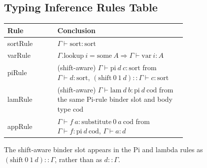 \subsection{Typing Inference Rules Table}\label{subsec:reconstruction-typing-rules-table}

\begin{center}
\begin{tabular}{l p{0.72\linewidth}}
\hline
Rule & Conclusion \\
\hline
sortRule & $\Gamma \vdash \mathrm{sort} : \mathrm{sort}$ \\
varRule & $\Gamma.\mathrm{lookup}\ i = \mathrm{some}\ A \Rightarrow \Gamma \vdash \mathrm{var}\ i : A$ \\
piRule & (shift-aware) $\Gamma \vdash \mathrm{pi}\ d\ c : \mathrm{sort}$ from $\Gamma \vdash d : \mathrm{sort}$, $(\mathrm{shift}\ 0\ 1\ d) :: \Gamma \vdash c : \mathrm{sort}$ \\
lamRule & (shift-aware) $\Gamma \vdash \mathrm{lam}\ d\ b : \mathrm{pi}\ d\ \mathrm{cod}$ from the same Pi-rule binder slot and body type $\mathrm{cod}$ \\
appRule & $\Gamma \vdash f\ a : \mathrm{substitute}\ 0\ a\ \mathrm{cod}$ from $\Gamma \vdash f : \mathrm{pi}\ d\ \mathrm{cod}$, $\Gamma \vdash a : d$ \\
\hline
\end{tabular}
\end{center}

The shift-aware binder slot appears in the Pi and lambda rules as
$(\mathrm{shift}\ 0\ 1\ d) :: \Gamma$, rather than as $d :: \Gamma$.
